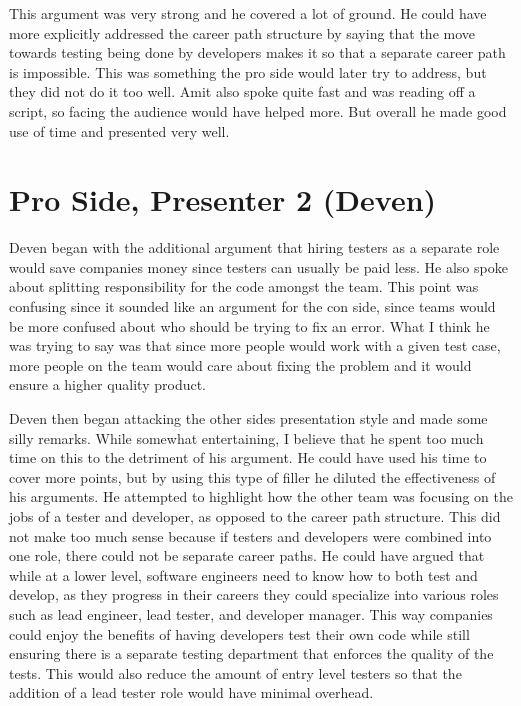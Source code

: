 \documentclass[letterpaper,twocolumn,10pt]{article}
\begin{document}
This argument was very strong and he covered a lot of ground. He could have more explicitly addressed
the career path structure by saying that the move towards testing being done by developers makes it so
that a separate career path is impossible. This was something the pro side would later try to address, but
they did not do it too well. Amit also spoke quite fast and was reading off a script, so facing the audience
would have helped more. But overall he made good use of time and presented very well.

\section{Pro Side, Presenter 2 (Deven)}

Deven began with the additional argument that hiring testers as a separate role would save companies money
since testers can usually be paid less. He also spoke about splitting responsibility for the code amongst
the team. This point was confusing since it sounded like an argument for the con side, since teams would
be more confused about who should be trying to fix an error. What I think he was trying to say was that
since more people would work with a given test case, more people on the team would care about fixing the problem
and it would ensure a higher quality product.

Deven then began attacking the other sides presentation style and made some silly remarks. While somewhat entertaining,
I believe that he spent too much time on this to the detriment of his argument. He could have used his time
to cover more points, but by using this type of filler he diluted the effectiveness of his arguments. He attempted
to highlight how the other team was focusing on the jobs of a tester and developer, as opposed to the career
path structure. This did not make too much sense because if testers and developers were combined into one role,
there could not be separate career paths. He could have argued that while at a lower level, software engineers
need to know how to both test and develop, as they progress in their careers they could specialize into various
roles such as lead engineer, lead tester, and developer manager. This way companies could enjoy the benefits
of having developers test their own code while still ensuring there is a separate testing department that enforces
the quality of the tests. This would also reduce the amount of entry level testers so that the addition of a lead
tester role would have minimal overhead.
\end{document}
